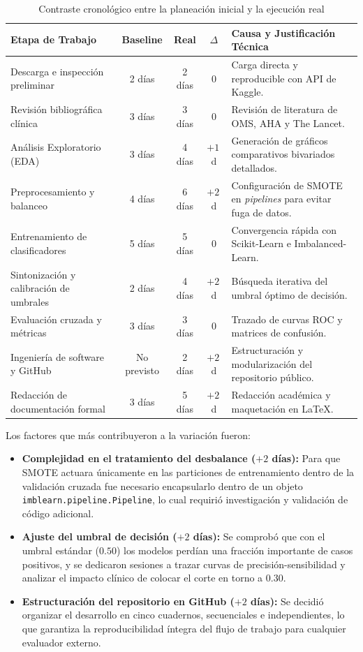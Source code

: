 \documentclass[12pt,a4paper]{article}
\begin{document}
\begin{table}[H]
\centering
\small
\caption{Contraste cronológico entre la planeación inicial y la ejecución real}
\label{tab:cronograma}
\begin{tabularx}{\textwidth}{@{}L c c c L@{}}
\toprule
\textbf{Etapa de Trabajo} & \textbf{Baseline} & \textbf{Real} & \textbf{$\Delta$} & \textbf{Causa y Justificación Técnica} \\
\midrule
Descarga e inspección preliminar & 2 días & 2 días & $0$ & Carga directa y reproducible con API de Kaggle. \\
Revisión bibliográfica clínica & 3 días & 3 días & $0$ & Revisión de literatura de OMS, AHA y The Lancet. \\
Análisis Exploratorio (EDA) & 3 días & 4 días & $+1\,$d & Generación de gráficos comparativos bivariados detallados. \\
Preprocesamiento y balanceo & 4 días & 6 días & $+2\,$d & Configuración de SMOTE en \textit{pipelines} para evitar fuga de datos. \\
Entrenamiento de clasificadores & 5 días & 5 días & $0$ & Convergencia rápida con Scikit-Learn e Imbalanced-Learn. \\
Sintonización y calibración de umbrales & 2 días & 4 días & $+2\,$d & Búsqueda iterativa del umbral óptimo de decisión. \\
Evaluación cruzada y métricas & 3 días & 3 días & $0$ & Trazado de curvas ROC y matrices de confusión. \\
Ingeniería de software y GitHub & No previsto & 2 días & $+2\,$d & Estructuración y modularización del repositorio público. \\
Redacción de documentación formal & 3 días & 5 días & $+2\,$d & Redacción académica y maquetación en \LaTeX. \\
\bottomrule
\end{tabularx}
\end{table}

\noindent Los factores que más contribuyeron a la variación fueron:
\begin{itemize}[itemsep=0.3em, leftmargin=1.2cm]
    \item \textbf{Complejidad en el tratamiento del desbalance ($+2$ días):} Para que SMOTE actuara únicamente en las particiones de entrenamiento dentro de la validación cruzada fue necesario encapsularlo dentro de un objeto \texttt{imblearn.pipeline.Pipeline}, lo cual requirió investigación y validación de código adicional.
    \item \textbf{Ajuste del umbral de decisión ($+2$ días):} Se comprobó que con el umbral estándar ($0.50$) los modelos perdían una fracción importante de casos positivos, y se dedicaron sesiones a trazar curvas de precisión-sensibilidad y analizar el impacto clínico de colocar el corte en torno a $0.30$.
    \item \textbf{Estructuración del repositorio en GitHub ($+2$ días):} Se decidió organizar el desarrollo en cinco cuadernos, secuenciales e independientes, lo que garantiza la reproducibilidad íntegra del flujo de trabajo para cualquier evaluador externo.
\end{itemize}
\end{document}

